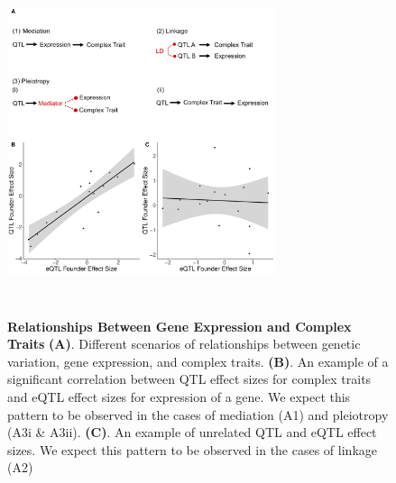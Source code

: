 \documentclass[article,9pt,twocolumn,twoside]{rilabRxiv}
\begin{document}
\begin{figure}[ht!]
\centering
\includegraphics[width=0.7\textwidth,height=4in]{figures/scenarios_figure.pdf}
\caption{\textbf{Relationships Between Gene Expression and Complex Traits} 
\textbf{(A)}. Different scenarios of relationships between genetic variation, gene expression, and complex traits.
\textbf{(B)}. An example of a significant correlation between QTL effect sizes for complex traits and eQTL effect sizes for expression of a gene. 
 We expect this pattern to be observed in the cases of mediation (A1) and pleiotropy (A3i \& A3ii).
 \textbf{(C)}. An example of unrelated QTL and eQTL effect sizes. We expect this pattern to be observed in the cases of linkage (A2)}
\label{fig:scenarios}
\end{figure}
\end{document}

